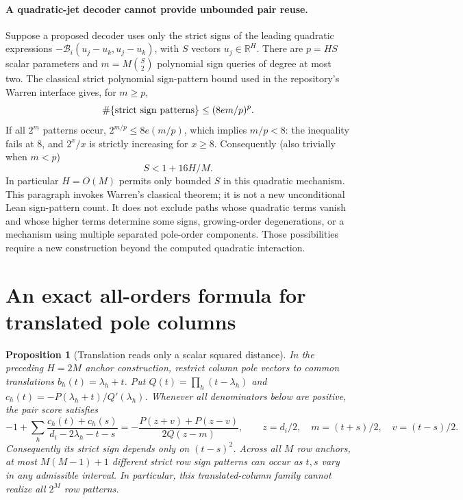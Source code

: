 \documentclass[11pt]{article}
\newtheorem{proposition}[theorem]{Proposition}
\begin{document}
\paragraph{A quadratic-jet decoder cannot provide unbounded pair reuse.}
Suppose a proposed decoder uses only the strict signs of the leading
quadratic expressions
$-\mathcal B_i(u_j-u_k,u_j-u_k)$, with $S$ vectors
$u_j\in\mathbb R^H$. There are $p=HS$ scalar parameters and
$m=M\binom S2$ polynomial sign queries of degree at most two.
The classical strict polynomial sign-pattern bound used in the
repository's Warren interface gives, for $m\ge p$,
\[
 \#\{\hbox{strict sign patterns}\}\le(8em/p)^p.
\]
If all $2^m$ patterns occur, $2^{m/p}\le8e(m/p)$, which implies
$m/p<8$: the inequality fails at $8$, and $2^x/x$ is strictly
increasing for $x\ge8$. Consequently (also trivially when $m<p$)
\[
 S<1+16H/M.
\]
In particular $H=O(M)$ permits only bounded $S$ in this quadratic
mechanism. This paragraph invokes Warren's classical theorem; it is
not a new unconditional Lean sign-pattern count. It does not exclude
paths whose quadratic terms vanish and whose higher terms determine
some signs, growing-order degenerations, or a mechanism using multiple
separated pole-order components. Those possibilities require a new
construction beyond the computed quadratic interaction.


\section{An exact all-orders formula for translated pole columns}

\begin{proposition}[Translation reads only a scalar squared distance]
In the preceding $H=2M$ anchor construction, restrict column pole vectors
to common translations $b_h(t)=\lambda_h+t$. Put
$Q(t)=\prod_h(t-\lambda_h)$ and
$c_h(t)=-P(\lambda_h+t)/Q'(\lambda_h)$. Whenever all denominators
below are positive, the pair score satisfies
\[
 -1+\sum_h\frac{c_h(t)+c_h(s)}{d_i-2\lambda_h-t-s}
 =-\frac{P(z+v)+P(z-v)}{2Q(z-m)},\qquad
 z=d_i/2,\quad m=(t+s)/2,\quad v=(t-s)/2.
\]
Consequently its strict sign depends only on $(t-s)^2$. Across all
$M$ row anchors, at most $M(M-1)+1$ different strict row sign patterns
can occur as $t,s$ vary in any admissible interval. In particular,
this translated-column family cannot realize all $2^M$ row patterns.
\end{proposition}
\end{document}
